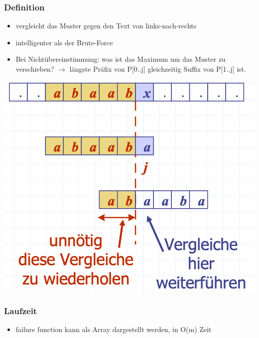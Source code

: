 \subsubsection{Definition}
\begin{itemize}
    \item vergleicht das Muster gegen den Text von links-nach-rechts
    \item intelligenter als der Brute-Force
    \item Bei Nichtübereinstimmung: was ist das Maximum um das Muster zu verschieben? $\rightarrow$ längste Präfix von P[0..j] gleichzeitig Suffix von P[1..j] ist.
\end{itemize}
\vspace{-8pt}
\begin{center}
    \includegraphics[scale=.22]{graphic/08 PatternMatching/KMP def.png}
\end{center}
\vspace{-8pt}
\subsubsection{Laufzeit}
\begin{itemize}
    \item failure function kann als Array dargestellt werden, in O(m) Zeit
\end{itemize}
